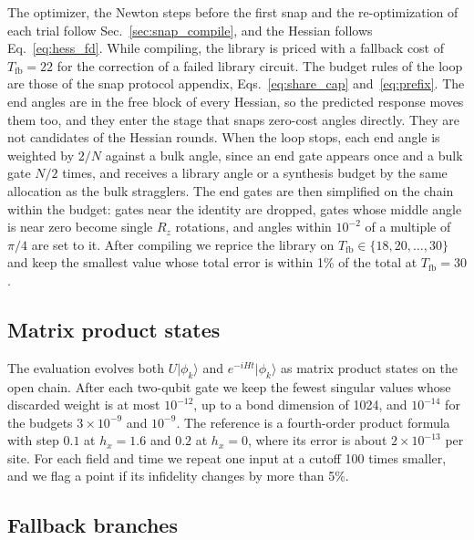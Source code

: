 The optimizer, the Newton steps before the first snap and the re-optimization of each trial follow Sec.~\ref{sec:snap_compile}, and the Hessian follows Eq.~\eqref{eq:hess_fd}. While compiling, the library is priced with a fallback cost of $T_{\mathrm{fb}} = 22$ for the correction of a failed library circuit. The budget rules of the loop are those of the snap protocol appendix, Eqs.~\eqref{eq:share_cap} and~\eqref{eq:prefix}. The end angles are in the free block of every Hessian, so the predicted response moves them too, and they enter the stage that snaps zero-cost angles directly. They are not candidates of the Hessian rounds. When the loop stops, each end angle is weighted by $2/N$ against a bulk angle, since an end gate appears once and a bulk gate $N/2$ times, and receives a library angle or a synthesis budget by the same allocation as the bulk stragglers. The end gates are then simplified on the chain within the budget: gates near the identity are dropped, gates whose middle angle is near zero become single $R_z$ rotations, and angles within $10^{-2}$ of a multiple of $\pi/4$ are set to it. After compiling we reprice the library on $T_{\mathrm{fb}} \in \{18, 20, \dots, 30\}$ and keep the smallest value whose total error is within 1\% of the total at $T_{\mathrm{fb}} = 30$.

\subsection{Matrix product states}

The evaluation evolves both $U|\phi_k\rangle$ and $e^{-iHt}|\phi_k\rangle$ as matrix product states on the open chain. After each two-qubit gate we keep the fewest singular values whose discarded weight is at most $10^{-12}$, up to a bond dimension of 1024, and $10^{-14}$ for the budgets $3 \times 10^{-9}$ and $10^{-9}$. The reference is a fourth-order product formula with step $0.1$ at $h_x = 1.6$ and $0.2$ at $h_x = 0$, where its error is about $2 \times 10^{-13}$ per site. For each field and time we repeat one input at a cutoff 100 times smaller, and we flag a point if its infidelity changes by more than 5\%.

\subsection{Fallback branches}

